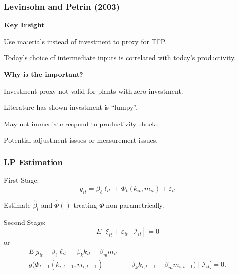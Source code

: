 \documentclass[11pt, aspectratio=169]{beamer}
\newenvironment{wideitemize}{\itemize\addtolength{\itemsep}{10pt}}{\enditemize}
\begin{document}
\begin{frame}[c]\frametitle{Levinsohn and Petrin (2003)}
    
    \textbf{Key Insight}

    \begin{wideitemize}
    	\item Use materials instead of investment to proxy for TFP.
    	\item Today's choice of intermediate inputs is correlated with today's productivity.
    \end{wideitemize}
    
    \bigskip
    \textbf{Why is the important?}
    \begin{wideitemize}
    	\item Investment proxy not valid for plants with zero investment.
    	\item Literature has shown investment is ``lumpy''.
    	\begin{wideitemize}
    		\item May not immediate respond to productivity shocks.
    		\item Potential adjustment issues or measurement issues.
    	\end{wideitemize}
    	
    \end{wideitemize}
    
\end{frame}


\begin{frame}[c]\frametitle{LP Estimation}
    
\begin{wideitemize}
	\item First Stage:
	$$	y_{it} = \beta_{\ell} \ell_{it} + \Phi_t(k_{it},m_{it}) + \varepsilon_{it}$$
	\item Estimate $\hat{\beta}_l$ and $\hat{\Phi}()$ treating $\Phi$ non-parametrically.
	\item Second Stage:	
	$$E[\xi_{it} + \varepsilon_{it} \mid \mathcal{I}_{it}] = 0$$
	or 
	\begin{align*}
	E[y_{it} - \beta_{\ell} \ell_{it} - \beta_k k_{it} - \beta_m m_{it} -& \\
	g(\Phi_{t-1}(k_{i,t-1},m_{i,t-1})-&\beta_k k_{i,t-1} - \beta_m m_{i,t-1}) \mid \mathcal{I}_{it}] = 0.
	\end{align*}
\end{wideitemize}

\end{frame}
\end{document}
